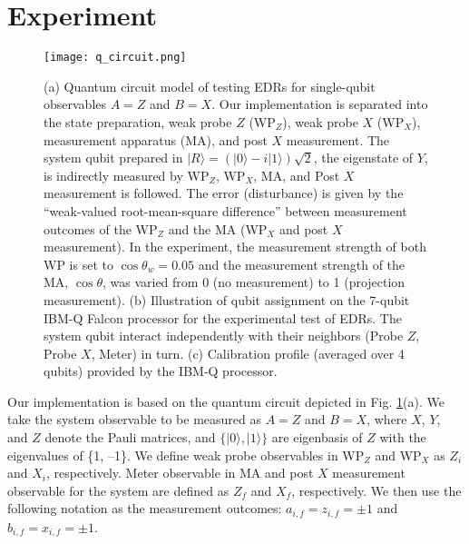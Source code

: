 \documentclass[%
reprint,
superscriptaddress,
 amsmath,amssymb,
 aps,
pra,
]{revtex4-2}
\begin{document}
\section{Experiment\label{sec:experiment}}
\begin{figure*}[htbp]%
\centering
\texttt{[image: q\_circuit.png]} 
\caption{(a) Quantum circuit model of testing EDRs for single-qubit observables $A=Z$ and $B=X$. Our implementation is separated into the state preparation, weak probe $Z$ (WP$_Z$),  weak probe $X$ (WP$_X$), measurement apparatus (MA), and post $X$ measurement. The system qubit prepared in $|R\rangle =( |0\rangle-i|1\rangle)\sqrt{2}$, the eigenstate of $Y$, is indirectly measured by WP$_Z$, WP$_X$, MA, and Post $X$ measurement is followed. The error (disturbance) is given by the “weak-valued root-mean-square difference” between measurement outcomes of the WP$_Z$ and the MA (WP$_X$ and post $X$ measurement). In the experiment, the measurement strength of both WP is set to $\cos\theta_{w}=0.05$ and the measurement strength of the MA, $\cos \theta$, was varied from 0 (no measurement) to 1 (projection measurement). (b) Illustration of qubit assignment on the 7-qubit IBM-Q Falcon processor for the experimental test of EDRs. The system qubit interact independently with their neighbors (Probe $Z$, Probe $X$, Meter) in turn. (c) Calibration profile (averaged over 4 qubits) provided by the IBM-Q processor.} 
\label{q.circuit} 
\end{figure*}
Our implementation is based on the quantum circuit depicted in Fig. \ref{q.circuit}(a). We take the system observable to be measured as $A=Z$ and $B=X$, where $X$, $Y$, and $Z$ denote the Pauli matrices, and $\{|0\rangle, |1\rangle\}$ are eigenbasis of $Z$ with the eigenvalues of \{1, –1\}.
We define weak probe observables in WP$_Z$ and WP$_X$ as $Z_i$ and $X_i$, respectively.  
Meter observable in MA and post $X$ measurement observable for the system are defined as $Z_f$ and $X_f$, respectively. 
We then use the following notation as the measurement outcomes: $a_{i, f}=z_{i, f} =\pm 1$ and $b_{i, f}=x_{i, f} =\pm 1$.
\end{document}
